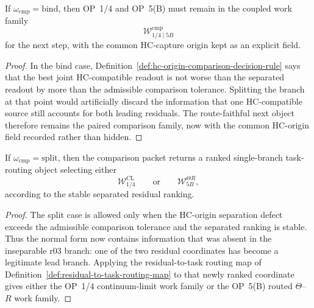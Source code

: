 \begin{proposition}
\label{prop:bind-branch-retains-common-hc-capture-origin}
If $\omega_{\mathrm{cmp}}=\mathrm{bind}$, then OP~1/4 and OP~5(B) must remain in the coupled work family
\[
  \mathcal W_{1/4\mid 5B}^{\mathrm{cmp}}
\]
for the next step, with the common HC-capture origin kept as an explicit field.
\end{proposition}

\begin{proof}
In the bind case, Definition~\ref{def:hc-origin-comparison-decision-rule} says that the best joint HC-compatible readout is not worse than the separated readout by more than the admissible comparison tolerance.  Splitting the branch at that point would artificially discard the information that one HC-compatible source still accounts for both leading residuals.  The route-faithful next object therefore remains the paired comparison family, now with the common HC-origin field recorded rather than hidden.
\end{proof}

\begin{proposition}
\label{prop:split-branch-returns-to-ranked-single-branch-work}
If $\omega_{\mathrm{cmp}}=\mathrm{split}$, then the comparison packet returns a ranked single-branch task-routing object selecting either
\[
  \mathcal W_{1/4}^{\mathrm{CL}}
  \qquad\text{or}\qquad
  \mathcal W_{5B}^{\Theta R},
\]
according to the stable separated residual ranking.
\end{proposition}

\begin{proof}
The split case is allowed only when the HC-origin separation defect exceeds the admissible comparison tolerance and the separated ranking is stable.  Thus the normal form now contains information that was absent in the inseparable r03 branch: one of the two residual coordinates has become a legitimate lead branch.  Applying the residual-to-task routing map of Definition~\ref{def:residual-to-task-routing-map} to that newly ranked coordinate gives either the OP~1/4 continuum-limit work family or the OP~5(B) routed $\Theta$--$R$ work family.
\end{proof}

